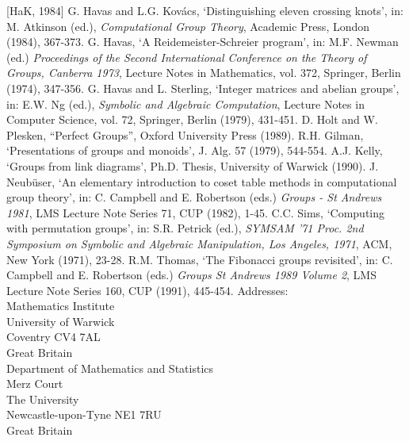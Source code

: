[HaK, 1984] G. Havas and L.G. Kov\'{a}cs, `Distinguishing eleven crossing
knots', in: M. Atkinson (ed.), {\em Computational Group Theory},
Academic Press, London (1984), 367-373.\newline
\newline
[Hav, 1974] G. Havas, `A Reidemeister-Schreier program', in: 
M.F. Newman (ed.) {\em Proceedings of the
Second International Conference on the Theory of Groups, Canberra 1973},
Lecture Notes in Mathematics, vol. 372,
Springer, Berlin (1974), 347-356.\newline
\newline
[HaS, 1979] G. Havas and L. Sterling, `Integer matrices and abelian groups',
in: E.W. Ng (ed.), {\em Symbolic and Algebraic Computation}, Lecture Notes
in Computer Science, vol. 72, Springer, Berlin (1979), 431-451.\newline
\newline
[HoP, 1989] D. Holt and W. Plesken, ``Perfect Groups'', Oxford University Press
(1989).\newline
\newline
[Gil, 1979] R.H. Gilman, `Presentations of groups and monoids', J. Alg. 57
(1979), 544-554.\newline
\newline
[Kel, 1990] A.J. Kelly, `Groups from link diagrams',
Ph.D. Thesis, University of Warwick (1990).\newline
\newline
[Neu, 1982] J. Neub\"{u}ser, `An elementary introduction to coset table
methods in computational group theory', in: C. Campbell and E. Robertson (eds.)
{\em Groups - St Andrews 1981}, LMS Lecture Note Series 71, CUP (1982),
1-45.\newline
\newline
[Sims, 1971] C.C. Sims, `Computing with permutation groups', in:
S.R. Petrick (ed.), {\em SYMSAM '71
Proc. 2nd Symposium on Symbolic and Algebraic Manipulation, Los Angeles,
1971}, ACM, New York (1971), 23-28.\newline
\newline
[Tho, 1991] R.M. Thomas, `The Fibonacci groups revisited',
in: C. Campbell and E. Robertson (eds.)
{\em Groups St Andrews 1989 Volume 2}, LMS Lecture Note Series 160,
CUP (1991), 445-454.\newline
\newline
\newline
\newline
Addresses:\\[5mm]
Mathematics Institute\\
University of Warwick\\
Coventry CV4 7AL \\
Great Britain\\[5mm]
Department of Mathematics and Statistics\\
Merz Court\\
The University\\
Newcastle-upon-Tyne NE1 7RU\\
Great Britain\\[5mm]


